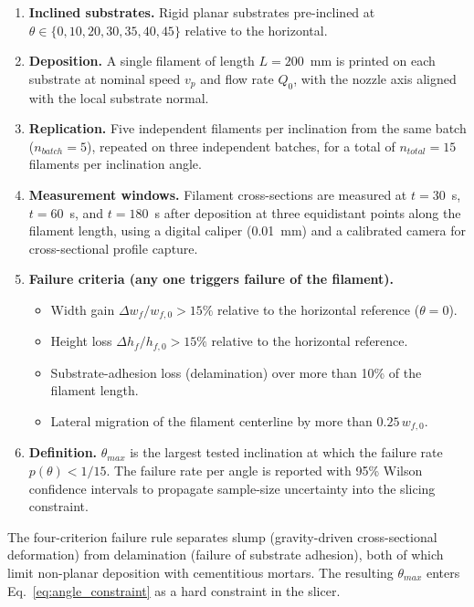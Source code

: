 \documentclass[conference]{IEEEtran}
\begin{document}
\begin{enumerate}
    \item \textbf{Inclined substrates.} Rigid planar substrates pre-inclined at $\theta \in \{0, 10, 20, 30, 35, 40, 45\}$\textdegree{} relative to the horizontal.

    \item \textbf{Deposition.} A single filament of length $L = 200$~mm is printed on each substrate at nominal speed $v_p$ and flow rate $Q_0$, with the nozzle axis aligned with the local substrate normal.

    \item \textbf{Replication.} Five independent filaments per inclination from the same batch ($n_{batch} = 5$), repeated on three independent batches, for a total of $n_{total} = 15$ filaments per inclination angle.

    \item \textbf{Measurement windows.} Filament cross-sections are measured at $t = 30$~s, $t = 60$~s, and $t = 180$~s after deposition at three equidistant points along the filament length, using a digital caliper (0.01~mm) and a calibrated camera for cross-sectional profile capture.

    \item \textbf{Failure criteria (any one triggers failure of the filament).}
    \begin{itemize}
        \item Width gain $\Delta w_f / w_{f,0} > 15\%$ relative to the horizontal reference ($\theta = 0$\textdegree).
        \item Height loss $\Delta h_f / h_{f,0} > 15\%$ relative to the horizontal reference.
        \item Substrate-adhesion loss (delamination) over more than 10\% of the filament length.
        \item Lateral migration of the filament centerline by more than $0.25\, w_{f,0}$.
    \end{itemize}

    \item \textbf{Definition.} $\theta_{max}$ is the largest tested inclination at which the failure rate $p(\theta) < 1/15$. The failure rate per angle is reported with 95\% Wilson confidence intervals to propagate sample-size uncertainty into the slicing constraint.
\end{enumerate}

The four-criterion failure rule separates slump (gravity-driven cross-sectional deformation) from delamination (failure of substrate adhesion), both of which limit non-planar deposition with cementitious mortars. The resulting $\theta_{max}$ enters Eq.~\ref{eq:angle_constraint} as a hard constraint in the slicer.
\end{document}
